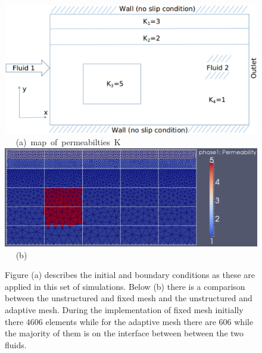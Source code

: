 \begin{landscape}
\begin{figure}[ht] 
\vbox{
\hbox{\hspace{4.0cm}
\includegraphics[width=.75\textwidth]{./Pics/map_of_boundaries.pdf} 
}
\vspace{0.0cm}
\hbox{\hspace{6.5cm} (a) map of permeabilties K   
}
\vspace{0.25cm}
\hbox{\hspace{4.0cm}
\includegraphics[width=.9\textwidth]{./Pics/map_of_boundaries_1.pdf}
}
\vspace{0.0cm}
\hbox{\hspace{9cm} (b)      
}
}     
\caption{Figure (a) describes the initial and boundary conditions as these are applied in this set of simulations. Below (b) there is a comparison between the unstructured and fixed mesh and the unstructured and adaptive mesh. During the implementation of fixed mesh initially there $4606$ elements while for the adaptive mesh there are $606$ while the majority of them is on the interface between between the two fluids. }
\label{fig:testcase_heter_domain}
\end{figure}
\end{landscape}
\clearpage



